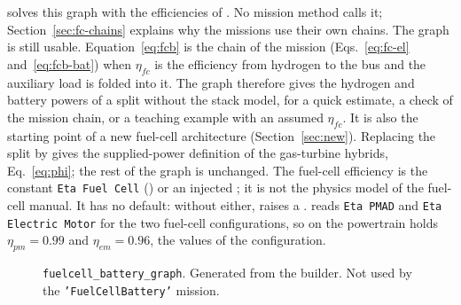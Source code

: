 \documentclass[a4paper,11pt]{article}
\begin{document}
 solves this graph with the efficiencies of
. No mission method calls it; Section~\ref{sec:fc-chains} explains why
the missions use their own chains. The graph is still usable. Equation~\eqref{eq:fcb} is the
chain of the mission (Eqs.~\eqref{eq:fc-el} and~\eqref{eq:fcb-bat}) when $\eta_{fc}$ is the
efficiency from hydrogen to the bus and the auxiliary load is folded into it. The graph
therefore gives the hydrogen and battery powers of a split without the stack model, for a
quick estimate, a check of the mission chain, or a teaching example with an assumed
$\eta_{fc}$. It is also the starting point of a new fuel-cell architecture
(Section~\ref{sec:new}). Replacing the split by  gives the
supplied-power definition of the gas-turbine hybrids, Eq.~\eqref{eq:phi}; the rest of the
graph is unchanged. The fuel-cell efficiency is the constant
\texttt{Eta Fuel Cell} () or an injected ;
it is not the physics model of the fuel-cell manual. It has no default: without either,
 raises a . 
reads \texttt{Eta PMAD} and \texttt{Eta Electric Motor} for the two fuel-cell configurations,
so on  the powertrain holds $\eta_{pm} = 0.99$ and
$\eta_{em} = 0.96$, the values of the configuration.

\begin{figure}[htbp]
\centering

\caption{\texttt{fuelcell\_battery\_graph}. Generated from the builder. Not used by the
\texttt{'FuelCellBattery'} mission.}\label{fig:g-fcb}
\end{figure}
\end{document}
